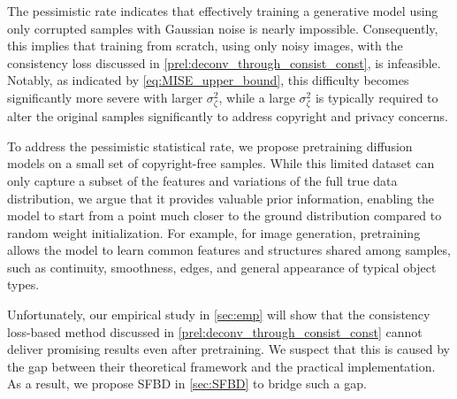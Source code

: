 The pessimistic rate indicates that effectively training a generative model using only corrupted samples with Gaussian noise is nearly impossible. Consequently, this implies that training from scratch,  using only noisy images, with the consistency loss discussed in \cref{prel:deconv_through_consist_const}, is infeasible. Notably, as indicated by \cref{eq:MISE_upper_bound}, this difficulty becomes significantly more severe with larger $\sigma_{\zeta}^2$, while a large $\sigma_{\zeta}^2$ is typically required to alter the original samples significantly to address copyright and privacy concerns.

To address the pessimistic statistical rate, we propose pretraining diffusion models on a small set of copyright-free samples. While this limited dataset can only capture a subset of the features and variations of the full true data distribution, we argue that it provides valuable prior information, enabling the model to start from a point much closer to the ground distribution compared to random weight initialization. For example, for image generation, pretraining allows the model to learn common features and structures shared among samples, such as continuity, smoothness, edges, and general appearance of typical object types.

Unfortunately, our empirical study in \cref{sec:emp} will show that the consistency loss-based method discussed in \cref{prel:deconv_through_consist_const} cannot deliver promising results even after pretraining. We suspect that this is caused by the gap between their theoretical framework and the practical implementation. As a result, we propose SFBD in \cref{sec:SFBD} to bridge such a gap. 

